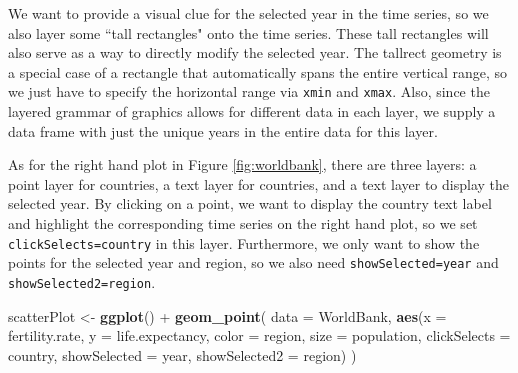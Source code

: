 \documentclass[12pt,]{isuthesis}
\newenvironment{Shaded}{\begin{snugshade}}{\end{snugshade}}
\newcommand{\KeywordTok}[1]{\textcolor[rgb]{0.13,0.29,0.53}{\textbf{{#1}}}}
\newcommand{\DataTypeTok}[1]{\textcolor[rgb]{0.13,0.29,0.53}{{#1}}}
\newcommand{\FloatTok}[1]{\textcolor[rgb]{0.00,0.00,0.81}{{#1}}}
\newcommand{\StringTok}[1]{\textcolor[rgb]{0.31,0.60,0.02}{{#1}}}
\newcommand{\NormalTok}[1]{{#1}}
\begin{document}
We want to provide a visual clue for the selected year in the time
series, so we also layer some ``tall rectangles" onto the time series.
These tall rectangles will also serve as a way to directly modify the
selected year. The tallrect geometry is a special case of a rectangle
that automatically spans the entire vertical range, so we just have to
specify the horizontal range via \texttt{xmin} and \texttt{xmax}. Also,
since the layered grammar of graphics allows for different data in each
layer, we supply a data frame with just the unique years in the entire
data for this layer.

\begin{Shaded}
\end{Shaded}

As for the right hand plot in Figure \ref{fig:worldbank}, there are
three layers: a point layer for countries, a text layer for countries,
and a text layer to display the selected year. By clicking on a point,
we want to display the country text label and highlight the
corresponding time series on the right hand plot, so we set
\texttt{clickSelects=country} in this layer. Furthermore, we only want
to show the points for the selected year and region, so we also need
\texttt{showSelected=year} and \texttt{showSelected2=region}.

\begin{Shaded}
\begin{Highlighting}[]
\NormalTok{scatterPlot <-}\StringTok{ }\KeywordTok{ggplot}\NormalTok{() +}\StringTok{ }\KeywordTok{geom_point}\NormalTok{(}
  \DataTypeTok{data =} \NormalTok{WorldBank,}
  \KeywordTok{aes}\NormalTok{(}\DataTypeTok{x =} \NormalTok{fertility.rate, }\DataTypeTok{y =} \NormalTok{life.expectancy,}
      \DataTypeTok{color =} \NormalTok{region, }\DataTypeTok{size =} \NormalTok{population,}
      \DataTypeTok{clickSelects =} \NormalTok{country,}
      \DataTypeTok{showSelected =} \NormalTok{year,}
      \DataTypeTok{showSelected2 =} \NormalTok{region)}
\NormalTok{)}
\end{Highlighting}
\end{Shaded}
\end{document}
